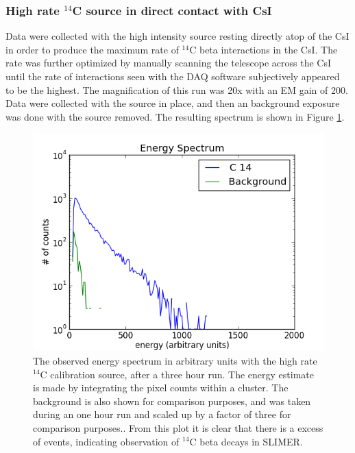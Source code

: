 \documentclass[11pt]{article}
\newcommand{\nuc}[2]{\ensuremath{^{#1}}#2}
\begin{document}
\subsubsection{High rate \nuc{14}{C} source in direct contact with CsI} 
Data were collected with the high intensity source resting directly atop of the CsI in order to produce the maximum rate of \nuc{14}{C} beta interactions in the CsI. The rate was further optimized by manually scanning the telescope  across the CsI until the rate of interactions seen with the DAQ software subjectively appeared to be the highest. The magnification of this run was 20x with an EM gain of 200. 
Data were collected with the source in place, and then an background exposure was done with the source removed. The resulting spectrum is shown in Figure \ref{pic:high_rate_c4_no_collimator_spectrum}.

\begin{figure}[h!p] 
  \begin{center}     
   \includegraphics[]{eriks_plots/cluster_smooth_plot_8_13_2013.png}
	\caption{The observed energy spectrum in arbitrary units with the high rate \nuc{14}{C} calibration source, after a three hour run. The energy estimate is made by integrating the pixel counts within a cluster. The background is also shown for comparison purposes, and was taken during an one hour run and scaled up by a factor of three for comparison purposes.. From this plot it is clear that there is a excess of events, indicating observation of \nuc{14}{C} beta decays in SLIMER.  
           }
       \label{pic:high_rate_c4_no_collimator_spectrum}
   \end{center}    
 \end{figure} 
\end{document}
